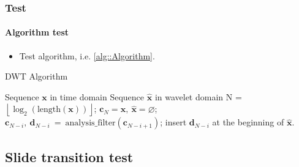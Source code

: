 \documentclass[aspectratio=169,hyperref={implicit=true}]{beamer}
\begin{document}
\begin{frame}

\frametitle{Test}
\framesubtitle{Algorithm test}

\begin{itemize}
  \item Test algorithm, i.e. \cref{alg::Algorithm}.
\end{itemize}

\begin{algorithm}[H]
  \caption{DWT Algorithm}
  \label{alg::Algorithm}
  \begin{algorithmic}[1]
    \REQUIRE Sequence $\mathbf{x}$ in time domain
    \ENSURE Sequence $\hat{\mathbf{x}}$ in wavelet domain
    \STATE N = $\left\lfloor \log_2 (\mathrm{length}(\mathbf{x})) \right\rfloor$;
    \STATE $\mathbf{c}_{N} = \mathbf{x},~ \hat{\mathbf{x}} = \varnothing$;
    \STATE $\mathbf{c}_{N-i},~\mathbf{d}_{N-i}~=~\mathrm{analysis\_filter}(\mathbf{c}_{N-i+1})$;
    \STATE insert $\mathbf{d}_{N-i}$ at the beginning of $\hat{\mathbf{x}}$.
    \ENDFOR
  \end{algorithmic}
\end{algorithm}
\end{frame}

\subsection{Slide transition test}
\end{document}
